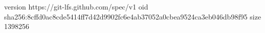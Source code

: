 version https://git-lfs.github.com/spec/v1
oid sha256:8cffd0ac8cde5414ff7d42d9902fc6e4ab37052a0cbea9524ca3eb046db98f95
size 1398256
